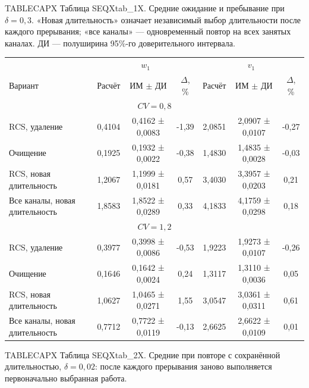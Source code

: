 \noindent TABLECAPX Таблица SEQXtab_1X. Средние ожидание и пребывание при $\delta=0{,}3$. «Новая длительность» означает независимый выбор длительности после каждого прерывания; «все каналы» --- одновременный повтор на всех занятых каналах. ДИ --- полуширина 95\%-го доверительного интервала.\par

\setlength{\tabcolsep}{3pt}
\begin{tabular}{p{4.2cm}cccccc}
\toprule
 & \multicolumn{3}{c}{$w_1$} & \multicolumn{3}{c}{$v_1$} \\
Вариант & Расчёт & ИМ $\pm$ ДИ & $\Delta$, \% & Расчёт & ИМ $\pm$ ДИ & $\Delta$, \% \\
\midrule
\multicolumn{7}{c}{$CV=0,8$} \\
RCS, удаление & 0,4104 & 0,4162 ± 0,0083 & -1,39 & 2,0851 & 2,0907 ± 0,0107 & -0,27 \\
Очищение & 0,1925 & 0,1932 ± 0,0022 & -0,38 & 1,4830 & 1,4835 ± 0,0028 & -0,03 \\
RCS, новая длительность & 1,2067 & 1,1999 ± 0,0181 & 0,57 & 3,4030 & 3,3957 ± 0,0203 & 0,21 \\
Все каналы, новая длительность & 1,8583 & 1,8522 ± 0,0289 & 0,33 & 4,1833 & 4,1759 ± 0,0298 & 0,18 \\
\multicolumn{7}{c}{$CV=1,2$} \\
RCS, удаление & 0,3977 & 0,3998 ± 0,0086 & -0,53 & 1,9223 & 1,9273 ± 0,0107 & -0,26 \\
Очищение & 0,1646 & 0,1642 ± 0,0024 & 0,24 & 1,3117 & 1,3110 ± 0,0036 & 0,05 \\
RCS, новая длительность & 1,0627 & 1,0465 ± 0,0271 & 1,55 & 3,0547 & 3,0361 ± 0,0311 & 0,61 \\
Все каналы, новая длительность & 0,7712 & 0,7722 ± 0,0119 & -0,13 & 2,6625 & 2,6622 ± 0,0109 & 0,01 \\
\bottomrule
\end{tabular}




\noindent TABLECAPX Таблица SEQXtab_2X. Средние при повторе с сохранённой длительностью, $\delta=0{,}02$: после каждого прерывания заново выполняется первоначально выбранная работа.\par

